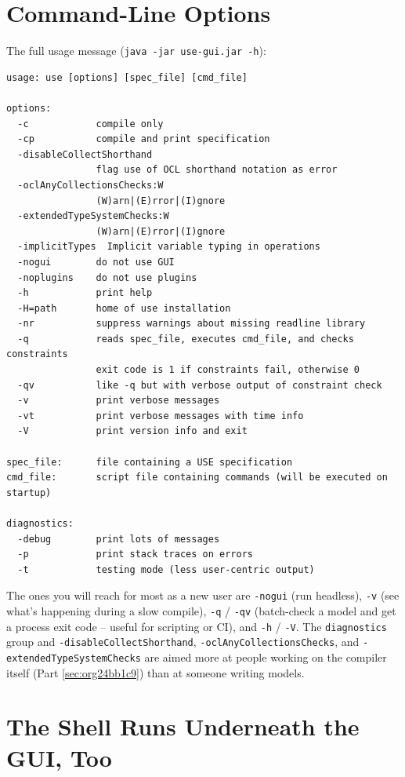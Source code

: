 \documentclass[11pt,twoside,a4paper]{book}
\begin{document}
\section{Command-Line Options}
\label{sec:org7f068e1}

The full usage message (\texttt{java -jar use-gui.jar -h}):

\begin{verbatim}
usage: use [options] [spec_file] [cmd_file]

options:
  -c            compile only
  -cp           compile and print specification
  -disableCollectShorthand
                flag use of OCL shorthand notation as error
  -oclAnyCollectionsChecks:W
                (W)arn|(E)rror|(I)gnore
  -extendedTypeSystemChecks:W
                (W)arn|(E)rror|(I)gnore
  -implicitTypes  Implicit variable typing in operations
  -nogui        do not use GUI
  -noplugins    do not use plugins
  -h            print help
  -H=path       home of use installation
  -nr           suppress warnings about missing readline library
  -q            reads spec_file, executes cmd_file, and checks constraints
                exit code is 1 if constraints fail, otherwise 0
  -qv           like -q but with verbose output of constraint check
  -v            print verbose messages
  -vt           print verbose messages with time info
  -V            print version info and exit

spec_file:      file containing a USE specification
cmd_file:       script file containing commands (will be executed on startup)

diagnostics:
  -debug        print lots of messages
  -p            print stack traces on errors
  -t            testing mode (less user-centric output)
\end{verbatim}

The ones you will reach for most as a new user are \texttt{-nogui} (run
headless), \texttt{-v} (see what's happening during a slow compile), \texttt{-q} /
\texttt{-qv} (batch-check a model and get a process exit code -- useful for
scripting or CI), and \texttt{-h} / \texttt{-V}. The \texttt{diagnostics} group and
\texttt{-disableCollectShorthand}, \texttt{-oclAnyCollectionsChecks}, and
\texttt{-extendedTypeSystemChecks} are aimed more at people working on the
compiler itself (Part \ref{sec:org24bb1c9}) than at someone writing
models.

\section{The Shell Runs Underneath the GUI, Too}
\label{sec:org0818ca1}
\end{document}

